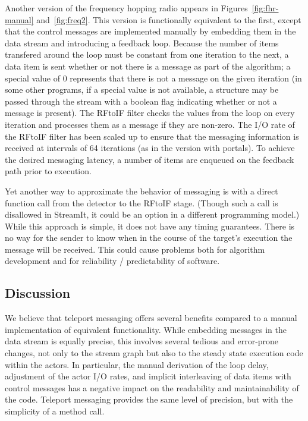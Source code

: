 Another version of the frequency hopping radio appears in
Figures~\ref{fig:fhr-manual} and~\ref{fig:freq2}.  This version is
functionally equivalent to the first, except that the control messages
are implemented manually by embedding them in the data stream and
introducing a feedback loop.  Because the number of items transfered
around the loop must be constant from one iteration to the next, a
data item is sent whether or not there is a message as part of the
algorithm; a special value of 0 represents that there is not a message
on the given iteration (in some other programs, if a special value is
not available, a structure may be passed through the stream with a
boolean flag indicating whether or not a message is present).  The
RFtoIF filter checks the values from the loop on every iteration and
processes them as a message if they are non-zero.  The I/O rate of the
RFtoIF filter has been scaled up to ensure that the messaging
information is received at intervals of 64 iterations (as in the
version with portals).  To achieve the desired messaging latency, a
number of items are enqueued on the feedback path prior to execution.

Yet another way to approximate the behavior of messaging is with a
direct function call from the detector to the RFtoIF stage.  (Though
such a call is disallowed in StreamIt, it could be an option in a
different programming model.)  While this approach is simple, it does
not have any timing guarantees.  There is no way for the sender to
know when in the course of the target's execution the message will be
received.  This could cause problems both for algorithm development
and for reliability / predictability of software.

\vspace{12pt}
\subsection{Discussion}

We believe that teleport messaging offers several benefits compared to
a manual implementation of equivalent functionality.  While embedding
messages in the data stream is equally precise, this involves several
tedious and error-prone changes, not only to the stream graph but also
to the steady state execution code within the actors.  In particular,
the manual derivation of the loop delay, adjustment of the actor I/O
rates, and implicit interleaving of data items with control messages
has a negative impact on the readability and maintainability of the
code.  Teleport messaging provides the same level of precision, but
with the simplicity of a method call.

